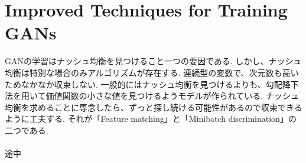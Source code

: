 \documentclass[dvipdfmx]{jsarticle}
\begin{document}
\section{Improved Techniques for Training GANs}
GANの学習はナッシュ均衡を見つけること一つの要因である.
しかし、ナッシュ均衡は特別な場合のみアルゴリズムが存在する. 
連続型の変数で、次元数も高いためなかなか収束しない. 
一般的にはナッシュ均衡を見つけるよりも、勾配降下法を用いて価値関数の小さな値を見つけるようモデルが作られている. 
ナッシュ均衡を求めることに専念したら、ずっと探し続ける可能性があるので収束できるように工夫する. 
それが「Feature matching」と「Minibatch discrimination」の二つである. 
\\
\\
途中
\end{document}
